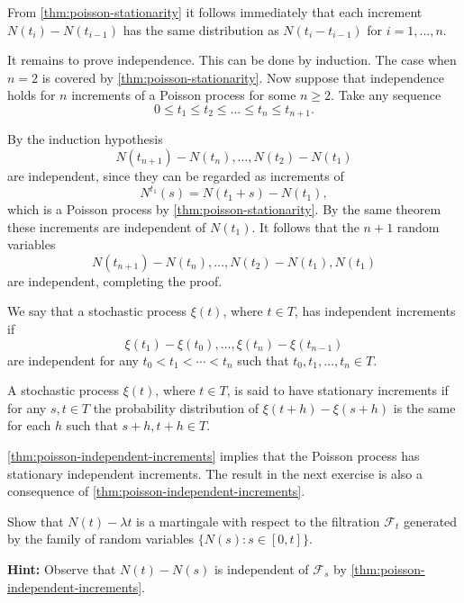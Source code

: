 \begin{Proof}
From \cref{thm:poisson-stationarity} it follows immediately that each increment $N(t_i) - N(t_{i-1})$ has the same distribution as $N(t_i - t_{i-1})$ for $i = 1, \ldots, n$.

It remains to prove independence. This can be done by induction. The case when $n = 2$ is covered by \cref{thm:poisson-stationarity}. Now suppose that independence holds for $n$ increments of a Poisson process for some $n \geq 2$. Take any sequence
\[
0 \leq t_1 \leq t_2 \leq \dots \leq t_n \leq t_{n+1}.
\]

By the induction hypothesis
\[
N(t_{n+1}) - N(t_n), \ldots, N(t_2) - N(t_1)
\]
are independent, since they can be regarded as increments of
\[
N^{t_1}(s) = N(t_1 + s) - N(t_1),
\]
which is a Poisson process by \cref{thm:poisson-stationarity}. By the same theorem these increments are independent of $N(t_1)$. It follows that the $n + 1$ random variables
\[
N(t_{n+1}) - N(t_n), \ldots, N(t_2) - N(t_1), N(t_1)
\]
are independent, completing the proof.
\end{Proof}

\begin{Definition}
\label{def:independent-increments}
We say that a stochastic process $\xi(t)$, where $t \in T$, has independent increments if
\[
\xi(t_1) - \xi(t_0), \ldots, \xi(t_n) - \xi(t_{n-1})
\]
are independent for any $t_0 < t_1 < \cdots < t_n$ such that $t_0, t_1, \ldots, t_n \in T$.
\end{Definition}

\begin{Definition}
\label{def:stationary-increments}
A stochastic process $\xi(t)$, where $t \in T$, is said to have stationary increments if for any $s, t \in T$ the probability distribution of $\xi(t + h) - \xi(s + h)$ is the same for each $h$ such that $s + h, t + h \in T$.
\end{Definition}

\cref{thm:poisson-independent-increments} implies that the Poisson process has stationary independent increments. The result in the next exercise is also a consequence of \cref{thm:poisson-independent-increments}.

\begin{Exercise}
\label{ex:poisson-martingale}
Show that $N(t) - \lambda t$ is a martingale with respect to the filtration $\mathcal{F}_t$ generated by the family of random variables $\{N(s): s \in [0, t]\}$.

\noindent\textbf{Hint:} Observe that $N(t) - N(s)$ is independent of $\mathcal{F}_s$ by \cref{thm:poisson-independent-increments}.
\end{Exercise}

